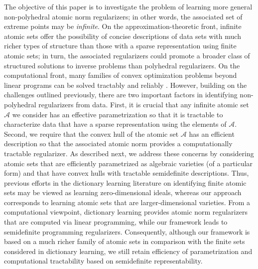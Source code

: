 \documentclass[11pt,letterpaper]{article}
\newcommand{\A}{\mathcal{A}}
\begin{document}
%

The objective of this paper is to investigate the problem of learning more general non-polyhedral atomic norm regularizers; in other words, the associated set of extreme points may be \emph{infinite}.  On the approximation-theoretic front, infinite atomic sets offer the possibility of concise descriptions of data sets with much richer types of structure than those with a sparse representation using finite atomic sets; in turn, the associated regularizers could promote a broader class of structured solutions to inverse problems than polyhedral regularizers.  On the computational front, many families of convex optimization problems beyond linear programs can be solved tractably and reliably \cite{NesNem:94}.  However, building on the challenges outlined previously, there are two important factors in identifying non-polyhedral regularizers from data.  First, it is crucial that any infinite atomic set $\A$ we consider has an effective parametrization so that it is tractable to characterize data that have a sparse representation using the elements of $\A$.  Second, we require that the convex hull of the atomic set $\A$ has an efficient description so that the associated atomic norm provides a computationally tractable regularizer.  As described next, we address these concerns by considering atomic sets that are efficiently parametrized as algebraic varieties (of a particular form) and that have convex hulls with tractable semidefinite descriptions.  Thus, previous efforts in the dictionary learning literature on identifying finite atomic sets may be viewed as learning zero-dimensional ideals, whereas our approach corresponds to learning atomic sets that are larger-dimensional varieties.  From a computational viewpoint, dictionary learning provides atomic norm regularizers that are computed via linear programming, while our framework leads to semidefinite programming regularizers.  Consequently, although our framework is based on a much richer family of atomic sets in comparison with the finite sets considered in dictionary learning, we still retain efficiency of parametrization and computational tractability based on semidefinite representability.
\end{document}

